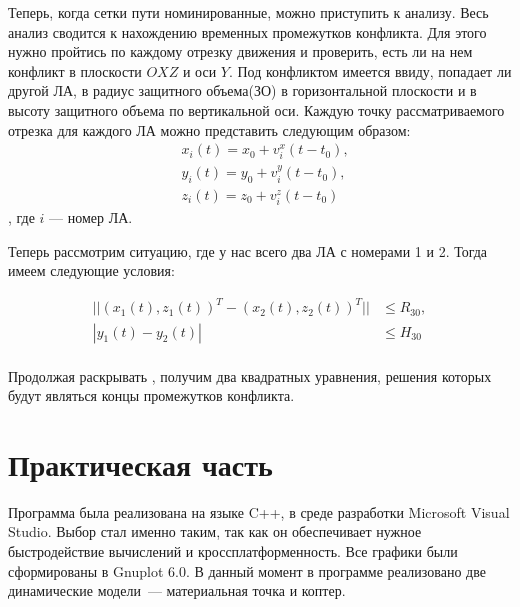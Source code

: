 \documentclass[a4paper,12pt]{article}
\begin{document}
Теперь, когда сетки пути номинированные, можно приступить к анализу. Весь анализ сводится к нахождению временных промежутков конфликта. Для этого нужно пройтись по каждому отрезку движения и проверить, есть ли на нем конфликт в плоскости $OXZ$ и оси $Y$. Под конфликтом имеется ввиду, попадает ли другой ЛА, в радиус защитного объема(ЗО) в горизонтальной плоскости и в высоту защитного объема по вертикальной оси. Каждую точку рассматриваемого отрезка для каждого ЛА можно представить следующим образом:
\begin{align*}
    &x_i(t) = x_0 + v_i^x(t - t_0),\\
    &y_i(t) = y_0 + v_i^y(t - t_0),\\
    &z_i(t) = z_0 + v_i^z(t - t_0)
\end{align*}
, где $i$ --- номер ЛА.

Теперь рассмотрим ситуацию, где у нас всего два ЛА с номерами 1 и 2. Тогда имеем  следующие условия:

\begin{align*}
    ||(x_1(t), z_1(t))^T - (x_2(t), z_2(t))^T|| &\leq R_{30},\\
    |y_1(t) - y_2(t)| &\leq H_{30}\\
\end{align*}

Продолжая раскрывать , получим два квадратных уравнения, решения которых будут являться концы промежутков конфликта.

\newpage
\section{Практическая часть}
Программа была реализована на языке C++, в среде разработки Microsoft Visual Studio. Выбор стал именно таким, так как он обеспечивает нужное быстродействие вычислений и кроссплатформенность. Все графики были сформированы в Gnuplot 6.0. В данный момент в программе реализовано две динамические модели~--- материальная точка и коптер. 
\end{document}
